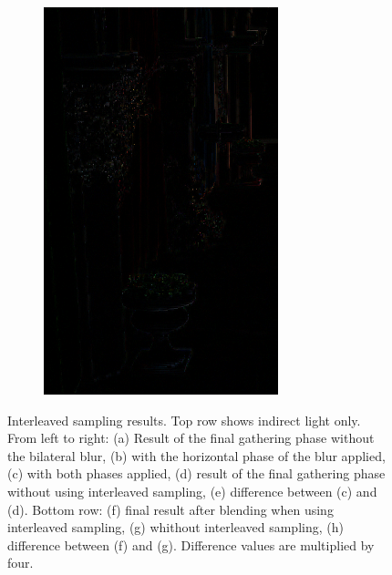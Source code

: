 \begin{figure}[htb]
\begin{subfigure}[b]{0.333\textwidth}
        \includegraphics[width=.95\textwidth]{screenshots/interleaved_difference_shaded}%
        \caption{}
        \label{fig:results:interleaved_difference_shaded}%
    \end{subfigure}%

      \caption{Interleaved sampling results. Top row shows indirect light only. From left to right: (a) Result of the final gathering phase without the bilateral blur, (b) with the horizontal phase of the blur applied, (c) with both phases applied, (d) result of the final gathering phase without using interleaved sampling, (e) difference between (c) and (d). Bottom row: (f) final result after blending when using interleaved sampling, (g) whithout interleaved sampling, (h) difference between (f) and (g). Difference values are multiplied by four.}
      \label{fig:results:interleaved_quality}
\end{figure}


